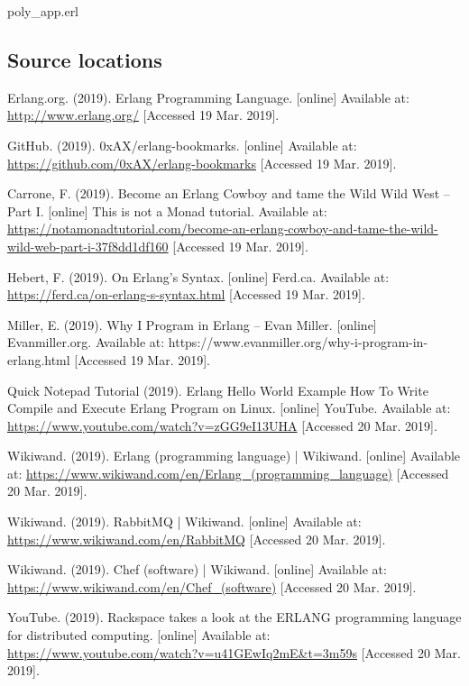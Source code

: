 \documentclass[11 pt]{IEEEtran}
\begin{document}
    
    poly\_app.erl
    
\subsection{Source locations}

  
\begin{thebibliography}{99}
Erlang.org. (2019). Erlang Programming Language. [online] Available at: \url{http://www.erlang.org/} [Accessed 19 Mar. 2019].

GitHub. (2019). 0xAX/erlang-bookmarks. [online] Available at: \url{https://github.com/0xAX/erlang-bookmarks} [Accessed 19 Mar. 2019].

Carrone, F. (2019). Become an Erlang Cowboy and tame the Wild Wild West -- Part I. [online] This is not a Monad tutorial. Available at: \url{https://notamonadtutorial.com/become-an-erlang-cowboy-and-tame-the-wild-wild-web-part-i-37f8dd1df160} [Accessed 19 Mar. 2019].

Hebert, F. (2019). On Erlang's Syntax. [online] Ferd.ca. Available at: \url{https://ferd.ca/on-erlang-s-syntax.html} [Accessed 19 Mar. 2019].

Miller, E. (2019). Why I Program in Erlang – Evan Miller. [online] Evanmiller.org. Available at: https://www.evanmiller.org/why-i-program-in-erlang.html [Accessed 19 Mar. 2019].

Quick Notepad Tutorial (2019). Erlang Hello World Example How To Write Compile and Execute Erlang Program on Linux. [online] YouTube. Available at: \url{https://www.youtube.com/watch?v=zGG9eI13UHA} [Accessed 20 Mar. 2019].

Wikiwand. (2019). Erlang (programming language) | Wikiwand. [online] Available at: \url{https://www.wikiwand.com/en/Erlang_(programming_language)} [Accessed 20 Mar. 2019].

Wikiwand. (2019). RabbitMQ | Wikiwand. [online] Available at: \url{https://www.wikiwand.com/en/RabbitMQ} [Accessed 20 Mar. 2019].

Wikiwand. (2019). Chef (software) | Wikiwand. [online] Available at: \url{https://www.wikiwand.com/en/Chef_(software)} [Accessed 20 Mar. 2019].

YouTube. (2019). Rackspace takes a look at the ERLANG programming language for distributed computing. [online] Available at: \url{https://www.youtube.com/watch?v=u41GEwIq2mE&t=3m59s} [Accessed 20 Mar. 2019].


\end{thebibliography}
\end{document}
